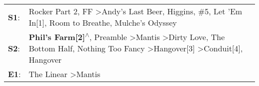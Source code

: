 \begin{supertabular}{p{0.03\textwidth}p{0.92\textwidth}}
 \textbf{S1}:  &                                                                                                  Rocker Part 2\textsuperscript{}, \enspace FF\textsuperscript{} \textgreater \enspace Andy's Last Beer\textsuperscript{}, \enspace Higgins\textsuperscript{}, \enspace \#5\textsuperscript{}, \enspace Let 'Em In[1]\textsuperscript{}, \enspace Room to Breathe\textsuperscript{}, \enspace Mulche's Odyssey\textsuperscript{}  \enspace  \\
 \textbf{S2}:  &  \textbf{Phil's Farm[2]\textsuperscript{$\wedge$}}, \enspace Preamble\textsuperscript{} \textgreater \enspace Mantis\textsuperscript{} \textgreater \enspace Dirty Love\textsuperscript{}, \enspace The Bottom Half\textsuperscript{}, \enspace Nothing Too Fancy\textsuperscript{} \textgreater \enspace Hangover[3]\textsuperscript{} \textgreater \enspace Conduit[4]\textsuperscript{}, \enspace Hangover\textsuperscript{}  \enspace  \\
 \textbf{E1}:  &                                                                                                                                                                                                                                                                                                                                                     The Linear\textsuperscript{} \textgreater \enspace Mantis\textsuperscript{}  \enspace  \\
\end{supertabular}

